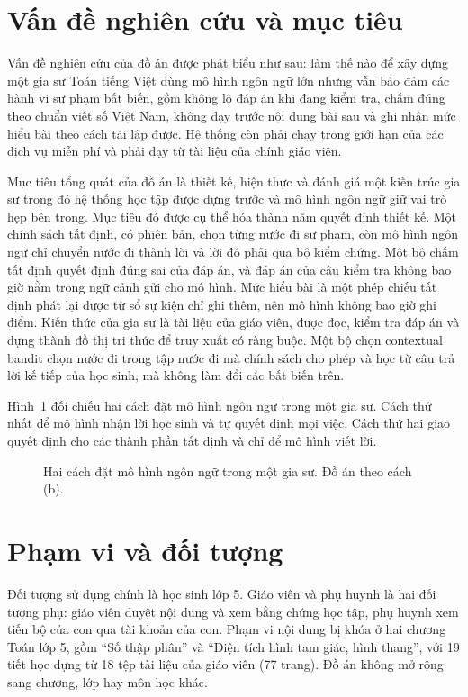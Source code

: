 \section{Vấn đề nghiên cứu và mục tiêu}

Vấn đề nghiên cứu của đồ án được phát biểu như sau: làm thế nào để xây dựng một gia sư Toán tiếng Việt dùng mô hình ngôn ngữ lớn nhưng vẫn bảo đảm các hành vi sư phạm bất biến, gồm không lộ đáp án khi đang kiểm tra, chấm đúng theo chuẩn viết số Việt Nam, không dạy trước nội dung bài sau và ghi nhận mức hiểu bài theo cách tái lập được. Hệ thống còn phải chạy trong giới hạn của các dịch vụ miễn phí và phải dạy từ tài liệu của chính giáo viên.

Mục tiêu tổng quát của đồ án là thiết kế, hiện thực và đánh giá một kiến trúc gia sư trong đó hệ thống học tập được dựng trước và mô hình ngôn ngữ giữ vai trò hẹp bên trong. Mục tiêu đó được cụ thể hóa thành năm quyết định thiết kế. Một chính sách tất định, có phiên bản, chọn từng nước đi sư phạm, còn mô hình ngôn ngữ chỉ chuyển nước đi thành lời và lời đó phải qua bộ kiểm chứng. Một bộ chấm tất định quyết định đúng sai của đáp án, và đáp án của câu kiểm tra không bao giờ nằm trong ngữ cảnh gửi cho mô hình. Mức hiểu bài là một phép chiếu tất định phát lại được từ sổ sự kiện chỉ ghi thêm, nên mô hình không bao giờ ghi điểm. Kiến thức của gia sư là tài liệu của giáo viên, được đọc, kiểm tra đáp án và dựng thành đồ thị tri thức để truy xuất có ràng buộc. Một bộ chọn contextual bandit chọn nước đi trong tập nước đi mà chính sách cho phép và học từ câu trả lời kế tiếp của học sinh, mà không làm đổi các bất biến trên.

Hình~\ref{fig:two-designs} đối chiếu hai cách đặt mô hình ngôn ngữ trong một gia sư. Cách thứ nhất để mô hình nhận lời học sinh và tự quyết định mọi việc. Cách thứ hai giao quyết định cho các thành phần tất định và chỉ để mô hình viết lời.

\begin{figure}[ht]
\centering

\caption{Hai cách đặt mô hình ngôn ngữ trong một gia sư. Đồ án theo cách (b).}
\label{fig:two-designs}
\end{figure}

\section{Phạm vi và đối tượng}

Đối tượng sử dụng chính là học sinh lớp 5. Giáo viên và phụ huynh là hai đối tượng phụ: giáo viên duyệt nội dung và xem bằng chứng học tập, phụ huynh xem tiến bộ của con qua tài khoản của con. Phạm vi nội dung bị khóa ở hai chương Toán lớp 5, gồm ``Số thập phân'' và ``Diện tích hình tam giác, hình thang'', với 19 tiết học dựng từ 18 tệp tài liệu của giáo viên (77 trang). Đồ án không mở rộng sang chương, lớp hay môn học khác.

